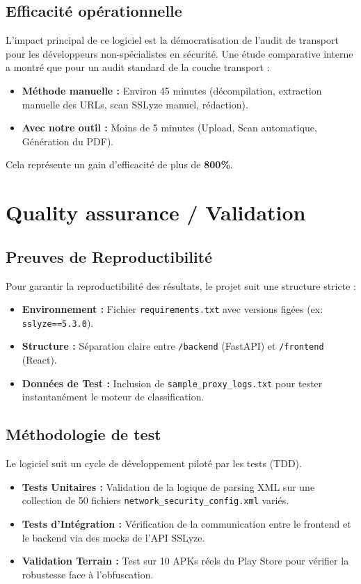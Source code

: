 \documentclass[11pt,a4paper]{article}
\begin{document}
\subsection{Efficacité opérationnelle}
L'impact principal de ce logiciel est la démocratisation de l'audit de transport pour les développeurs non-spécialistes en sécurité. Une étude comparative interne a montré que pour un audit standard de la couche transport :
\begin{itemize}
    \item \textbf{Méthode manuelle :} Environ 45 minutes (décompilation, extraction manuelle des URLs, scan SSLyze manuel, rédaction).
    \item \textbf{Avec notre outil :} Moins de 5 minutes (Upload, Scan automatique, Génération du PDF).
\end{itemize}
Cela représente un gain d'efficacité de plus de \textbf{800\%}.

\section{Quality assurance / Validation}

\subsection{Preuves de Reproductibilité}
Pour garantir la reproductibilité des résultats, le projet suit une structure stricte :
\begin{itemize}
    \item \textbf{Environnement :} Fichier \texttt{requirements.txt} avec versions figées (ex: \texttt{sslyze==5.3.0}).
    \item \textbf{Structure :} Séparation claire entre \texttt{/backend} (FastAPI) et \texttt{/frontend} (React).
    \item \textbf{Données de Test :} Inclusion de \texttt{sample\_proxy\_logs.txt} pour tester instantanément le moteur de classification.
\end{itemize}

\subsection{Méthodologie de test}
Le logiciel suit un cycle de développement piloté par les tests (TDD).
\begin{itemize}
    \item \textbf{Tests Unitaires :} Validation de la logique de parsing XML sur une collection de 50 fichiers \texttt{network\_security\_config.xml} variés.
    \item \textbf{Tests d'Intégration :} Vérification de la communication entre le frontend et le backend via des mocks de l'API SSLyze.
    \item \textbf{Validation Terrain :} Test sur 10 APKs réels du Play Store pour vérifier la robustesse face à l'obfuscation.
\end{itemize}
\end{document}
